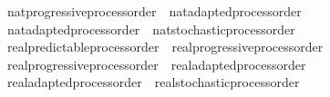 \begin{isabellebody}
%
\endisatagproof
{\isafoldproof}%
%
\isadelimproof
%
\endisadelimproof
\isanewline
{}\isamarkupfalse%
\ nat{\isacharunderscore}{\kern0pt}progressive{\isacharunderscore}{\kern0pt}process{\isacharunderscore}{\kern0pt}order\ {\isasymsubseteq}\ nat{\isacharunderscore}{\kern0pt}adapted{\isacharunderscore}{\kern0pt}process{\isacharunderscore}{\kern0pt}order%
\isadelimproof
\ %
\endisadelimproof
%
\isatagproof
\isacommand{{\isachardot}{\kern0pt}{\isachardot}{\kern0pt}}\isamarkupfalse%
%
\endisatagproof
{\isafoldproof}%
%
\isadelimproof
%
\endisadelimproof
\isanewline
{}\isamarkupfalse%
\ nat{\isacharunderscore}{\kern0pt}adapted{\isacharunderscore}{\kern0pt}process{\isacharunderscore}{\kern0pt}order\ {\isasymsubseteq}\ nat{\isacharunderscore}{\kern0pt}stochastic{\isacharunderscore}{\kern0pt}process{\isacharunderscore}{\kern0pt}order%
\isadelimproof
\ %
\endisadelimproof
%
\isatagproof
\isacommand{{\isachardot}{\kern0pt}{\isachardot}{\kern0pt}}\isamarkupfalse%
%
\endisatagproof
{\isafoldproof}%
%
\isadelimproof
%
\endisadelimproof
\isanewline
\isanewline
{}\isamarkupfalse%
\ real{\isacharunderscore}{\kern0pt}predictable{\isacharunderscore}{\kern0pt}process{\isacharunderscore}{\kern0pt}order\ {\isasymsubseteq}\ real{\isacharunderscore}{\kern0pt}progressive{\isacharunderscore}{\kern0pt}process{\isacharunderscore}{\kern0pt}order%
\isadelimproof
\ %
\endisadelimproof
%
\isatagproof
\isacommand{{\isachardot}{\kern0pt}{\isachardot}{\kern0pt}}\isamarkupfalse%
%
\endisatagproof
{\isafoldproof}%
%
\isadelimproof
%
\endisadelimproof
\isanewline
{}\isamarkupfalse%
\ real{\isacharunderscore}{\kern0pt}progressive{\isacharunderscore}{\kern0pt}process{\isacharunderscore}{\kern0pt}order\ {\isasymsubseteq}\ real{\isacharunderscore}{\kern0pt}adapted{\isacharunderscore}{\kern0pt}process{\isacharunderscore}{\kern0pt}order%
\isadelimproof
\ %
\endisadelimproof
%
\isatagproof
\isacommand{{\isachardot}{\kern0pt}{\isachardot}{\kern0pt}}\isamarkupfalse%
%
\endisatagproof
{\isafoldproof}%
%
\isadelimproof
%
\endisadelimproof
\isanewline
{}\isamarkupfalse%
\ real{\isacharunderscore}{\kern0pt}adapted{\isacharunderscore}{\kern0pt}process{\isacharunderscore}{\kern0pt}order\ {\isasymsubseteq}\ real{\isacharunderscore}{\kern0pt}stochastic{\isacharunderscore}{\kern0pt}process{\isacharunderscore}{\kern0pt}order%
\isadelimproof
\ %
\endisadelimproof
%
\isatagproof
\isacommand{{\isachardot}{\kern0pt}{\isachardot}{\kern0pt}}\isamarkupfalse%
%
\endisatagproof
{\isafoldproof}%
%
\isadelimproof
%
\endisadelimproof

\end{isabellebody}
